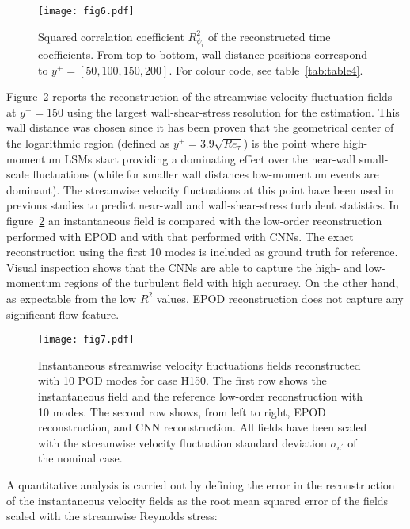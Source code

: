 \begin{figure}
\texttt{[image: fig6.pdf]}%
\caption{\label{fig:wide2}Squared correlation coefficient $R^2_{\psi_i}$ of the reconstructed time coefficients. From top to bottom, wall-distance positions correspond to $y^+=[50, 100, 150, 200]$. For colour code, see table~\ref{tab:table4}.}
\end{figure}

Figure~\ref{fig:uu_cnn2} reports the reconstruction of the streamwise velocity fluctuation fields at $y^+=150$ using the largest wall-shear-stress resolution for the estimation.
This wall distance was chosen since it has been proven that the geometrical center of the logarithmic region (defined as $y^+=3.9\sqrt{Re_{\tau}}$) is the point where high-momentum LSMs start providing a dominating effect over the near-wall small-scale fluctuations \citep{mathis2009large} (while for smaller wall distances low-momentum events are dominant).
The streamwise velocity fluctuations at this point have been used in previous studies to predict  near-wall \citep{marusic2010predictive, mathis2011predictive} and wall-shear-stress \citep{mathis2013estimating} turbulent statistics.
In figure~\ref{fig:uu_cnn2} an instantaneous field is compared with the low-order reconstruction performed with EPOD and with that performed with CNNs.
The exact reconstruction using the first 10 modes is included as ground truth for reference.
Visual inspection shows that the CNNs are able to capture the high- and low-momentum regions of the turbulent field with high accuracy.
On the other hand, as expectable from the low $R^2$ values, EPOD reconstruction does not capture any significant flow feature.

\begin{figure}
\texttt{[image: fig7.pdf]}%
\caption{\label{fig:uu_cnn2}Instantaneous streamwise velocity fluctuations fields reconstructed with 10 POD modes for case H150. The first row shows the instantaneous field and the reference low-order reconstruction with 10 modes. The second row shows, from left to right, EPOD reconstruction, and CNN reconstruction. All fields have been scaled with the streamwise velocity fluctuation standard deviation $\sigma _{u^{\prime}}$ of the nominal case.}
\end{figure}

A quantitative analysis is carried out by defining the error in the reconstruction of the instantaneous velocity fields as the root mean squared error of the fields scaled with the streamwise Reynolds stress:


